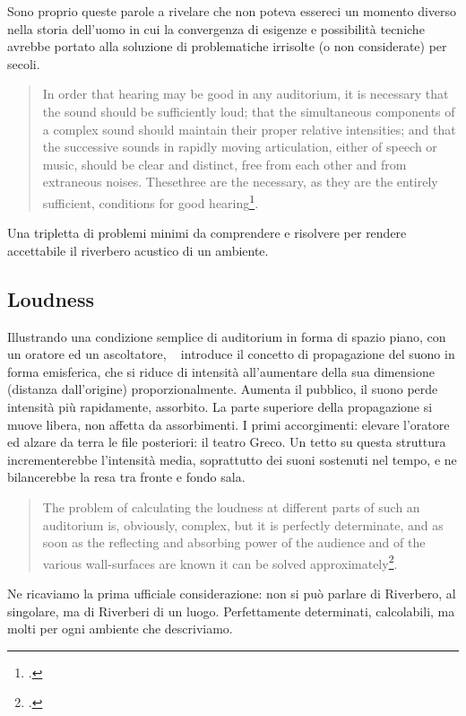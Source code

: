 Sono proprio queste parole a rivelare che non poteva essereci un momento diverso
nella storia dell'uomo in cui la convergenza di esigenze e possibilità tecniche
avrebbe portato alla soluzione di problematiche irrisolte (o non considerate)
per secoli.

\begin{quote}
  In order that hearing may be good in any auditorium, it is necessary that the
  sound should be sufficiently loud; that the simultaneous components of a
  complex sound should maintain their proper relative intensities;
  and that the successive sounds in rapidly moving articulation, either of speech
  or music, should be clear and distinct, free from each other and from extraneous
  noises. Thesethree are the necessary, as they are the entirely sufficient,
  conditions for good hearing\footcite{ws:rev}.
\end{quote}

Una tripletta di problemi minimi da comprendere e risolvere per rendere accettabile
il riverbero acustico di un ambiente.

\subsection{Loudness}

Illustrando una condizione semplice di auditorium in forma di spazio piano,
con un oratore ed un ascoltatore, \ws~ introduce il concetto di propagazione
del suono in forma emisferica, che si riduce di intensità all'aumentare della
sua dimensione (distanza dall'origine) proporzionalmente. Aumenta il pubblico,
il suono perde intensità più rapidamente, assorbito. La parte superiore della
propagazione si muove libera, non affetta da assorbimenti. I primi accorgimenti:
elevare l'oratore ed alzare da terra le file posteriori: il teatro Greco. Un tetto
su questa struttura incrementerebbe l'intensità media, soprattutto dei suoni
sostenuti nel tempo, e ne bilancerebbe la resa tra fronte e fondo sala.

\begin{quote}
  The problem of calculating the loudness at different parts of such an
  auditorium is, obviously, complex, but it is perfectly determinate, and as
  soon as the reflecting and absorbing power of the audience and of the various
  wall-surfaces are known it can be solved approximately\footcite{ws:rev}.
\end{quote}

Ne ricaviamo la prima ufficiale considerazione: non si può parlare di Riverbero,
al singolare, ma di Riverberi di un luogo. Perfettamente determinati, calcolabili,
ma molti per ogni ambiente che descriviamo.

